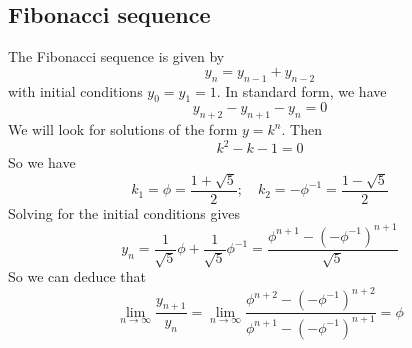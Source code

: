 \subsection{Fibonacci sequence}
The Fibonacci sequence is given by
\[
	y_n = y_{n-1} + y_{n-2}
\]
with initial conditions \(y_0 = y_1 = 1\).
In standard form, we have
\[
	y_{n+2} - y_{n+1} - y_n = 0
\]
We will look for solutions of the form \(y=k^n\).
Then
\[
	k^2 - k - 1 = 0
\]
So we have
\[
	k_1 = \phi = \frac{1 + \sqrt 5}{2};\quad k_2 = -\phi^{-1} = \frac{1 - \sqrt 5}{2}
\]
Solving for the initial conditions gives
\[
	y_n = \frac{1}{\sqrt 5}\phi + \frac{1}{\sqrt 5}\phi^{-1} = \frac{\phi^{n+1} - (-\phi^{-1})^{n+1}}{\sqrt{5}}
\]
So we can deduce that
\[
	\lim_{n \to \infty} \frac{y_{n+1}}{y_n} = \lim_{n \to \infty} \frac{\phi^{n+2} - (-\phi^{-1})^{n+2}}{\phi^{n+1} - (-\phi^{-1})^{n+1}} = \phi
\]

